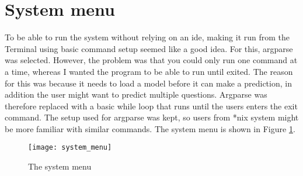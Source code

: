 \section{System menu} 
\label{sec:system_menu}
To be able to run the system without relying on an \gls{ide}, making it run from the Terminal using basic command setup seemed like a good idea. 
For this, argparse was selected.
However, the problem was that you could only run one command at a time, whereas I wanted the program to be able to run until exited.
The reason for this was because it needs to load a model before it can make a prediction, in addition the user might want to predict multiple questions. 
Argparse was therefore replaced with a basic while loop that runs until the users enters the exit command. 
The setup used for argparse was kept, so users from *nix system might be more familiar with similar commands.
The system menu is shown in Figure \ref{fig:system_menu}.

\begin{figure}[ht]
	\centering
	\texttt{[image: system\_menu]}
	\caption{The system menu}
	\label{fig:system_menu}
\end{figure}



